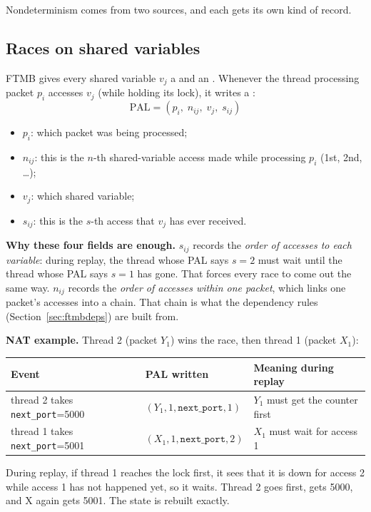 Nondeterminism comes from two sources, and each gets its own kind of record.

\subsection{Races on shared variables}
FTMB gives every shared variable $v_j$ a  and an . Whenever the thread processing packet $p_i$
accesses $v_j$ (while holding its lock), it writes a :
\[
  \text{PAL} = (p_i,\; n_{ij},\; v_j,\; s_{ij})
\]
\begin{itemize}
  \item $p_i$: which packet was being processed;
  \item $n_{ij}$: this is the $n$-th shared-variable access made while processing $p_i$ (1st, 2nd, \dots);
  \item $v_j$: which shared variable;
  \item $s_{ij}$: this is the $s$-th access that $v_j$ has ever received.
\end{itemize}

\textbf{Why these four fields are enough.} $s_{ij}$ records the \emph{order of accesses to each variable}: during replay, the thread
whose PAL says $s=2$ must wait until the thread whose PAL says $s=1$ has gone. That forces every race to come out the same way.
$n_{ij}$ records the \emph{order of accesses within one packet}, which links one packet's accesses into a chain. That chain is what
the dependency rules (Section~\ref{sec:ftmbdeps}) are built from.

\textbf{NAT example.} Thread 2 (packet $Y_1$) wins the race, then thread 1 (packet $X_1$):
\begin{center}
\begin{tabular}{@{}lll@{}}
\toprule
Event & PAL written & Meaning during replay\\
\midrule
thread 2 takes \texttt{next\_port}=5000 & $(Y_1, 1, \texttt{next\_port}, 1)$ & $Y_1$ must get the counter first\\
thread 1 takes \texttt{next\_port}=5001 & $(X_1, 1, \texttt{next\_port}, 2)$ & $X_1$ must wait for access 1\\
\bottomrule
\end{tabular}
\end{center}
During replay, if thread 1 reaches the lock first, it sees that it is down for access 2 while access 1 has not happened yet, so
it waits. Thread 2 goes first, gets 5000, and X again gets 5001. The state is rebuilt exactly.

